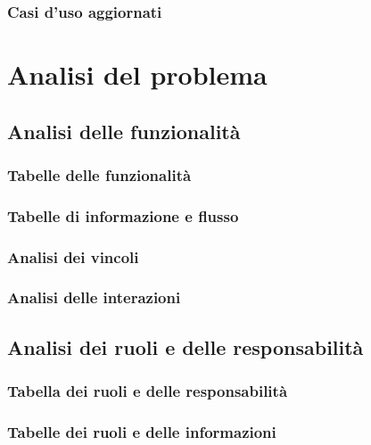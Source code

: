 \documentclass{article}
\begin{document}
\subsubsection{Casi d'uso aggiornati}



\pagebreak
\section{Analisi del problema}
\subsection{Analisi delle funzionalità}
\subsubsection{Tabelle delle funzionalità}

\subsubsection{Tabelle di informazione e flusso}

\subsubsection{Analisi dei vincoli}

\pagebreak
\subsubsection{Analisi delle interazioni}


\subsection{Analisi dei ruoli e delle responsabilità}
\subsubsection{Tabella dei ruoli e delle responsabilità}

\subsubsection{Tabelle dei ruoli e delle informazioni}

\pagebreak
\end{document}
